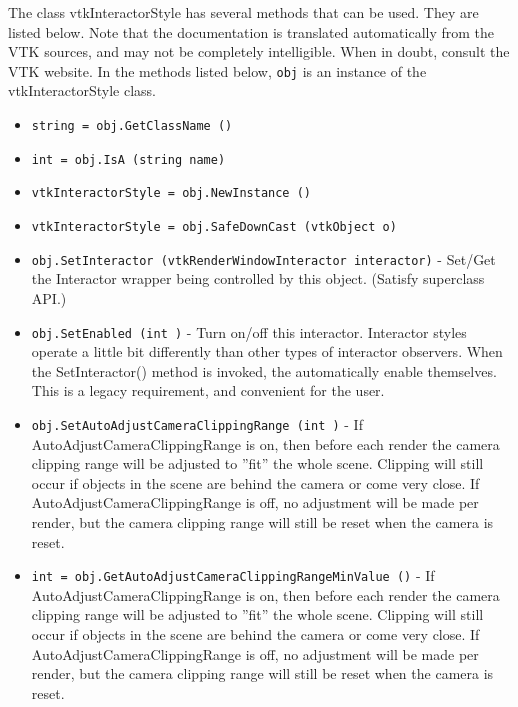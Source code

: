 The class vtkInteractorStyle has several methods that can be used.
  They are listed below.
Note that the documentation is translated automatically from the VTK sources,
and may not be completely intelligible.  When in doubt, consult the VTK website.
In the methods listed below, \verb|obj| is an instance of the vtkInteractorStyle class.
\begin{itemize}
\item  \verb|string = obj.GetClassName ()|

\item  \verb|int = obj.IsA (string name)|

\item  \verb|vtkInteractorStyle = obj.NewInstance ()|

\item  \verb|vtkInteractorStyle = obj.SafeDownCast (vtkObject o)|

\item  \verb|obj.SetInteractor (vtkRenderWindowInteractor interactor)| -  Set/Get the Interactor wrapper being controlled by this object.
 (Satisfy superclass API.)

\item  \verb|obj.SetEnabled (int )| -  Turn on/off this interactor. Interactor styles operate a little
 bit differently than other types of interactor observers. When
 the SetInteractor() method is invoked, the automatically enable
 themselves. This is a legacy requirement, and convenient for the
 user.

\item  \verb|obj.SetAutoAdjustCameraClippingRange (int )| -  If AutoAdjustCameraClippingRange is on, then before each render the
 camera clipping range will be adjusted to ''fit'' the whole scene. Clipping
 will still occur if objects in the scene are behind the camera or
 come very close. If AutoAdjustCameraClippingRange is off, no adjustment
 will be made per render, but the camera clipping range will still
 be reset when the camera is reset.

\item  \verb|int = obj.GetAutoAdjustCameraClippingRangeMinValue ()| -  If AutoAdjustCameraClippingRange is on, then before each render the
 camera clipping range will be adjusted to ''fit'' the whole scene. Clipping
 will still occur if objects in the scene are behind the camera or
 come very close. If AutoAdjustCameraClippingRange is off, no adjustment
 will be made per render, but the camera clipping range will still
 be reset when the camera is reset.


\end{itemize}
